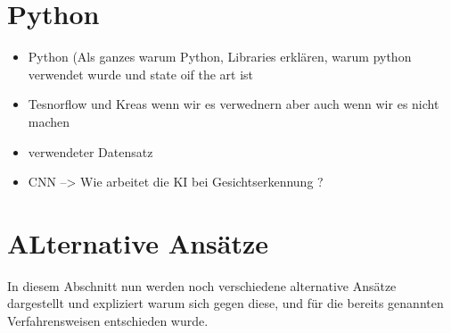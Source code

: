 \documentclass[12pt, a4paper]{scrbook}
\begin{document}
\section{Python}
\begin{itemize}
\item Python (Als ganzes warum Python, Libraries erklären, warum python verwendet wurde und state oif the art ist
\item Tesnorflow und Kreas wenn wir es verwednern aber auch wenn wir es nicht machen
\item verwendeter Datensatz
\item CNN --> Wie arbeitet die KI bei Gesichtserkennung ?
\end{itemize}

\section{ALternative Ansätze}
In diesem Abschnitt nun werden noch verschiedene alternative Ansätze dargestellt und expliziert warum sich gegen diese, und für die bereits genannten Verfahrensweisen entschieden wurde.
\end{document}
